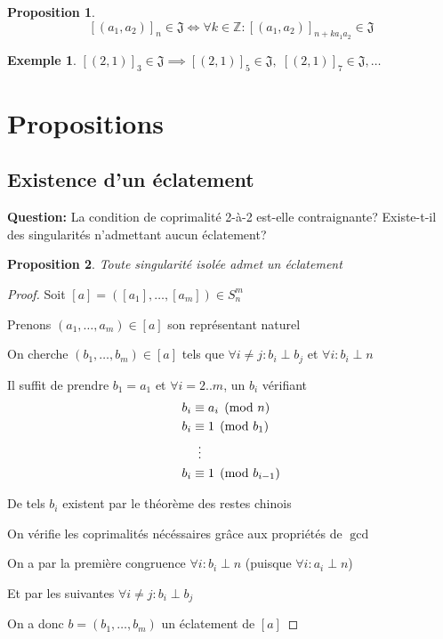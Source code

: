 \documentclass{article}
\newtheorem{proposition}{Proposition}
\newtheorem{example}{Exemple}
\begin{document}
\begin{proposition}
    \[ 
    {[(a_1, a_2)]}_n \in \mathfrak{J} \iff 
    \forall k \in \mathbb{Z}: {[(a_1, a_2)]}_{n+ka_1a_2} \in \mathfrak{J} 
    \]
\end{proposition}

\begin{example}
    ${[(2, 1)]}_3 \in \mathfrak{J} \implies {[(2, 1)]}_5 \in \mathfrak{J},\; {[(2, 1)]}_7 \in \mathfrak{J}, \dots$
\end{example}

\newpage

\section{Propositions}

\subsection{Existence d'un éclatement}

\textbf{Question:} La condition de coprimalité 2-à-2 est-elle contraignante? Existe-t-il des 
singularités n'admettant aucun éclatement?

\begin{proposition}
    Toute singularité isolée admet un éclatement
\end{proposition}

\begin{proof}
    Soit $[a] = ([a_1], \dots, [a_m]) \in S_n^m$

    Prenons $(a_1, \dots, a_m) \in [a]$ son représentant naturel

    On cherche $(b_1, \dots, b_m) \in [a]$ tels que $\forall i \neq j : b_i \perp b_j$ et $\forall i : b_i \perp n$

    Il suffit de prendre $b_1 = a_1$ et $\forall i = 2..m$, un $b_i$ vérifiant
    \begin{align*}
        b_i & \equiv a_i \pmod n \\
        b_i & \equiv 1 \pmod {b_1} \\
            & \vdotswithin{\equiv} \\
        b_i & \equiv 1 \pmod {b_{i-1}} 
    \end{align*}

    De tels $b_i$ existent par le théorème des restes chinois

    On vérifie les coprimalités nécéssaires grâce aux propriétés de $\gcd$

    On a par la première congruence $\forall i : b_i \perp n$ (puisque $\forall i : a_i \perp n$)

    Et par les suivantes $\forall i \neq j : b_i \perp b_j$

    On a donc $b = (b_1, \dots, b_m)$ un éclatement de $[a]$
\end{proof}
\end{document}
